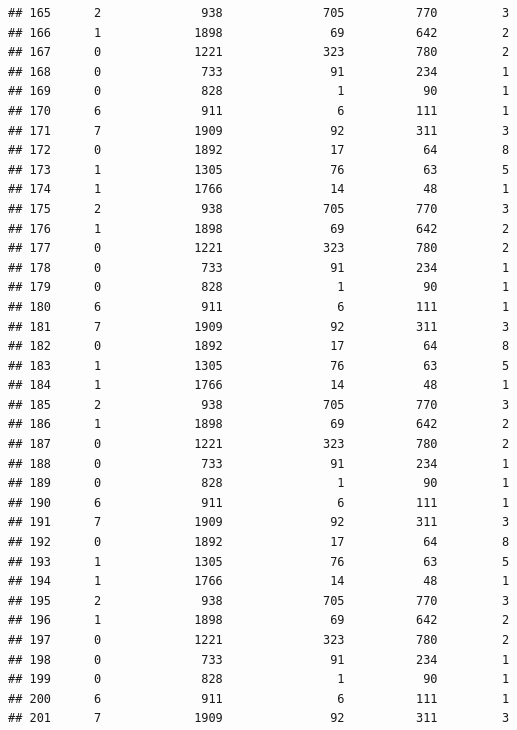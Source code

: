 \documentclass[
]{article}
\begin{document}
\begin{verbatim}
## 165      2              938              705          770         3
## 166      1             1898               69          642         2
## 167      0             1221              323          780         2
## 168      0              733               91          234         1
## 169      0              828                1           90         1
## 170      6              911                6          111         1
## 171      7             1909               92          311         3
## 172      0             1892               17           64         8
## 173      1             1305               76           63         5
## 174      1             1766               14           48         1
## 175      2              938              705          770         3
## 176      1             1898               69          642         2
## 177      0             1221              323          780         2
## 178      0              733               91          234         1
## 179      0              828                1           90         1
## 180      6              911                6          111         1
## 181      7             1909               92          311         3
## 182      0             1892               17           64         8
## 183      1             1305               76           63         5
## 184      1             1766               14           48         1
## 185      2              938              705          770         3
## 186      1             1898               69          642         2
## 187      0             1221              323          780         2
## 188      0              733               91          234         1
## 189      0              828                1           90         1
## 190      6              911                6          111         1
## 191      7             1909               92          311         3
## 192      0             1892               17           64         8
## 193      1             1305               76           63         5
## 194      1             1766               14           48         1
## 195      2              938              705          770         3
## 196      1             1898               69          642         2
## 197      0             1221              323          780         2
## 198      0              733               91          234         1
## 199      0              828                1           90         1
## 200      6              911                6          111         1
## 201      7             1909               92          311         3

\end{verbatim}
\end{document}

